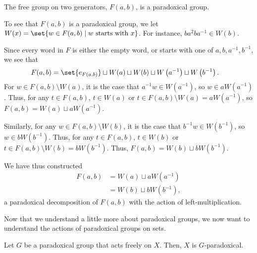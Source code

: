 \begin{example}
  The free group on two generators, $F(a,b)$, is a paradoxical group.\newline

  To see that $F(a,b)$ is a paradoxical group, we let $W(x) = \set{w\in F(a,b)\mid w\text{ starts with }x}$. For instance, $ba^2ba^{-1}\in W(b)$.\newline

  Since every word in $F$ is either the empty word, or starts with one of $a,b,a^{-1},b^{-1}$, we see that
  \begin{align*}
    F(a,b) &= \set{e_{F(a,b)}} \sqcup W(a) \sqcup W(b) \sqcup W\left(a^{-1}\right) \sqcup W\left(b^{-1}\right).
  \end{align*}
  For $w\in F(a,b)\setminus W(a)$, it is the case that $a^{-1}w\in W\left(a^{-1}\right)$, so $w\in aW\left(a^{-1}\right)$. Thus, for any $t\in F(a,b)$, $t\in W(a)$ or $t\in F(a,b)\setminus W(a) = aW\left(a^{-1}\right)$, so $F(a,b) = W(a)\sqcup aW\left(a^{-1}\right)$.

  Similarly, for any $w\in F(a,b)\setminus W(b)$, it is the case that $b^{-1}w\in W\left(b^{-1}\right)$, so $w\in bW\left(b^{-1}\right)$. Thus, for any $t\in F(a,b)$, $t\in W(b)$ or $t\in F(a,b) \setminus W(b) = bW\left(b^{-1}\right)$. Thus, $F(a,b) = W(b)\sqcup bW\left(b^{-1}\right)$.\newline

  We have thus constructed
  \begin{align*}
    F(a,b) &= W(a)\sqcup aW\left(a^{-1}\right)\\
           &= W(b)\sqcup bW\left(b^{-1}\right),
  \end{align*}
  a paradoxical decomposition of $F(a,b)$ with the action of left-multiplication.
\end{example}
Now that we understand a little more about paradoxical groups, we now want to understand the actions of paradoxical groups on sets.
\begin{proposition}
  Let $G$ be a paradoxical group that acts freely on $X$. Then, $X$ is $G$-paradoxical.
\end{proposition}
